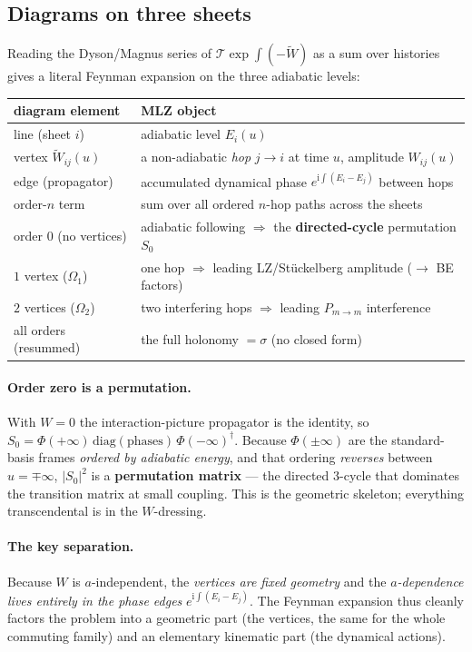 \documentclass[11pt]{article}
\newcommand{\ii}{\mathrm{i}}
\newcommand{\Tord}{\mathcal{T}}
\newcommand{\Wt}{\widetilde W}
\newcommand{\Pmid}{P_{m\to m}}
\begin{document}
\subsection{Diagrams on three sheets}
Reading the Dyson/Magnus series of $\Tord\exp\!\int(-\Wt)$ as a sum over histories gives a literal
Feynman expansion on the three adiabatic levels:

\begin{center}
\begin{tabular}{ll}
\toprule
\textbf{diagram element} & \textbf{MLZ object}\\
\midrule
line (sheet $i$) & adiabatic level $E_i(u)$ \\
vertex $\Wt_{ij}(u)$ & a non-adiabatic \emph{hop} $j\to i$ at time $u$, amplitude $W_{ij}(u)$ \\
edge (propagator) & accumulated dynamical phase $e^{\ii\int(E_i-E_j)}$ between hops \\
order-$n$ term & sum over all ordered $n$-hop paths across the sheets \\
\midrule
order $0$ (no vertices) & adiabatic following $\Rightarrow$ the \textbf{directed-cycle} permutation $S_0$ \\
$1$ vertex ($\Omega_1$) & one hop $\Rightarrow$ leading LZ/St\"uckelberg amplitude ($\to$ BE factors) \\
$2$ vertices ($\Omega_2$) & two interfering hops $\Rightarrow$ leading $\Pmid$ interference \\
all orders (resummed) & the full holonomy $=\sigma$ (no closed form) \\
\bottomrule
\end{tabular}
\end{center}

\paragraph{Order zero is a permutation.} With $W=0$ the interaction-picture propagator is the identity, so
$S_0=\Phi(+\infty)\,\mathrm{diag(phases)}\,\Phi(-\infty)^\dagger$. Because $\Phi(\pm\infty)$ are the
standard-basis frames \emph{ordered by adiabatic energy}, and that ordering \emph{reverses} between
$u=\mp\infty$, $|S_0|^2$ is a \textbf{permutation matrix} --- the directed $3$-cycle that dominates the
transition matrix at small coupling. This is the geometric skeleton; everything transcendental is in the
$W$-dressing.

\paragraph{The key separation.} Because $W$ is $a$-independent, the \emph{vertices are fixed geometry} and
the \emph{$a$-dependence lives entirely in the phase edges} $e^{\ii\int(E_i-E_j)}$. The Feynman expansion
thus cleanly factors the problem into a geometric part (the vertices, the same for the whole commuting
family) and an elementary kinematic part (the dynamical actions).
\end{document}
